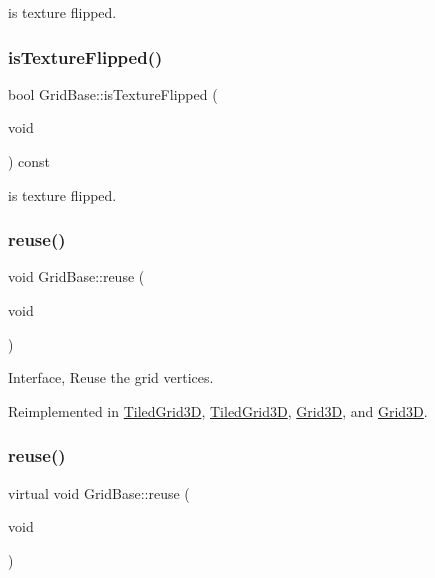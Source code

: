 is texture flipped. \mbox{\label{classGridBase_a12093e21451d5f4ac1835a9ded33fbd8}} 
\subsubsection{\texorpdfstring{is\+Texture\+Flipped()}{isTextureFlipped()}\hspace{0.1cm}{\footnotesize\ttfamily [2/2]}}
{\footnotesize\ttfamily bool Grid\+Base\+::is\+Texture\+Flipped (\begin{DoxyParamCaption}\item[{void}]{ }\end{DoxyParamCaption}) const\hspace{0.3cm}{\ttfamily [inline]}}

is texture flipped. \mbox{\label{classGridBase_a3567fe2ec6ea038325944d49a7bde37d}} 
\subsubsection{\texorpdfstring{reuse()}{reuse()}\hspace{0.1cm}{\footnotesize\ttfamily [1/2]}}
{\footnotesize\ttfamily void Grid\+Base\+::reuse (\begin{DoxyParamCaption}\item[{void}]{ }\end{DoxyParamCaption})\hspace{0.3cm}{\ttfamily [virtual]}}

Interface, Reuse the grid vertices. 

Reimplemented in \hyperlink{classTiledGrid3D_a5c415f064b5c2364ff8e27f33784db08}{Tiled\+Grid3D}, \hyperlink{classTiledGrid3D_a5eb814b2be0d828068c1a3ae68744049}{Tiled\+Grid3D}, \hyperlink{classGrid3D_a0a191279a3bb479d5d85a58c78685865}{Grid3D}, and \hyperlink{classGrid3D_ad6c4e2574b5a4104b7bde30bc083ffb7}{Grid3D}.

\mbox{\label{classGridBase_a8c057ea127c1cbbfa63ded2ade58446b}} 
\subsubsection{\texorpdfstring{reuse()}{reuse()}\hspace{0.1cm}{\footnotesize\ttfamily [2/2]}}
{\footnotesize\ttfamily virtual void Grid\+Base\+::reuse (\begin{DoxyParamCaption}\item[{void}]{ }\end{DoxyParamCaption})\hspace{0.3cm}{\ttfamily [virtual]}}

